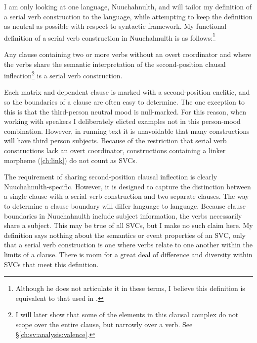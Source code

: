I am only looking at one language, Nuuchahnulth, and will tailor my definition of a serial verb construction to the language, while attempting to keep the definition as neutral as possible with respect to syntactic framework.
My functional definition of a serial verb construction in Nuuchahnulth is as follows:\footnote{Although he does not articulate it in these terms, I believe this definition is equivalent to that used in \citet[p.~97--113]{nakayama2001}.}

\ex \label{svcdef}
Any clause containing two or more verbs without an overt coordinator and where the verbs share the semantic interpretation of the second-position clausal inflection\footnote{I will later show that some of the elements in this clausal complex do not scope over the entire clause, but narrowly over a verb. See \S\ref{ch:sv:analysis:valence}.} is a serial verb construction.
\xe

Each matrix and dependent clause is marked with a second-position enclitic, and so the boundaries of a clause are often easy to determine. The one exception to this is that the third-person neutral mood is null-marked. For this reason, when working with speakers I deliberately elicted examples not in this person-mood combination. However, in running text it is unavoidable that many constructions will have third person subjects. Because of the restriction that serial verb constructions lack an overt coordinator, constructions containing a linker morpheme (\cref{ch:link}) do not count as SVCs.

The requirement of sharing second-position clausal inflection is clearly Nuuchahnulth-specific. However, it is designed to capture the distinction between a single clause with a serial verb construction and two separate clauses. The way to determine a clause boundary will differ language to language. Because clause boundaries in Nuuchahnulth include subject information, the verbs necessarily share a subject. This may be true of all SVCs, but I make no such claim here. My definition says nothing about the semantics or event properties of an SVC, only that a serial verb construction is one where verbs relate to one another within the limits of a clause. There is room for a great deal of difference and diversity within SVCs that meet this definition.%



